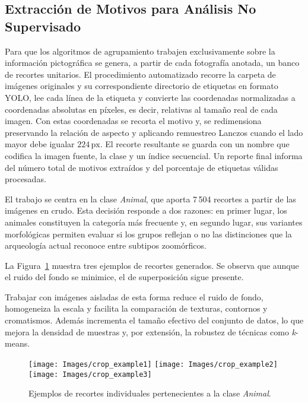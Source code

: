 \subsection{Extracción de Motivos para Análisis No Supervisado}

Para que los algoritmos de agrupamiento trabajen exclusivamente sobre la información pictográfica se genera, a partir de cada fotografía anotada, un banco de recortes unitarios.
El procedimiento automatizado recorre la carpeta de imágenes originales y su correspondiente directorio de etiquetas en formato YOLO, lee cada línea de la etiqueta y convierte las coordenadas normalizadas a coordenadas absolutas en píxeles, es decir, relativas al tamaño real de cada imagen.
Con estas coordenadas se recorta el motivo y, se redimensiona preservando la relación de aspecto y aplicando remuestreo Lanczos cuando el lado mayor debe igualar \(224\,\text{px}\).
El recorte resultante se guarda con un nombre que codifica la imagen fuente, la clase y un índice secuencial.
Un reporte final informa del número total de motivos extraídos y del porcentaje de etiquetas válidas procesadas.

El trabajo se centra en la clase \textit{Animal}, que aporta 7\,504 recortes a partir de las imágenes en crudo.
Esta decisión responde a dos razones: en primer lugar, los animales constituyen la categoría más frecuente y, en segundo lugar, sus variantes morfológicas permiten evaluar si los grupos reflejan o no las distinciones que la arqueología actual reconoce entre subtipos zoomórficos.

La Figura~\ref{fig:crop_example} muestra tres ejemplos de recortes generados.
Se observa que aunque el ruido del fondo se minimice, el de superposición sigue presente.

Trabajar con imágenes aisladas de esta forma reduce el ruido de fondo, homogeneiza la escala y facilita la comparación de texturas, contornos y cromatismos.
Además incrementa el tamaño efectivo del conjunto de datos, lo que mejora la densidad de muestras y, por extensión, la robustez de técnicas como \emph{k}-means.

\begin{figure}[!h]
    \centering
    \texttt{[image: Images/crop\_example1]}\hfill
    \texttt{[image: Images/crop\_example2]}\hfill
    \texttt{[image: Images/crop\_example3]}
    \caption{Ejemplos de recortes individuales pertenecientes a la clase \textit{Animal}.}
    \label{fig:crop_example}
\end{figure}

